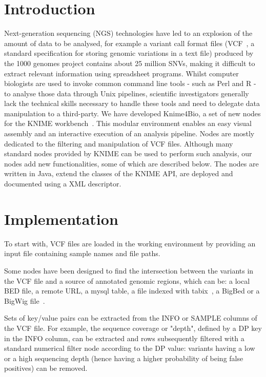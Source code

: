\documentclass{bioinfo}
\begin{document}
\section{Introduction}

Next-generation sequencing (NGS) technologies have led to an explosion of the amount of data to be analysed, for example a variant call format files (VCF~\citep{pmid21653522}, a standard specification for storing genomic variations in a text file)  produced by the 1000 genomes project contains about 25 million SNVs, making it difficult to extract relevant information using spreadsheet programs. Whilst computer biologists are used to invoke common command line tools - such as Perl and R - to analyse those data through Unix pipelines, scientific investigators generally lack the technical skills necessary to handle these tools and need to delegate data manipulation to a third-party. 
We have developed Knime4Bio, a set of new nodes  for the KNIME workbench~\citep{knimeref}. This modular environment enables an easy visual assembly and an interactive execution of an analysis pipeline. Nodes are mostly dedicated to the filtering and manipulation of VCF files. Although many standard nodes provided by KNIME can be used to perform such analysis, our nodes add new functionalities, some of which are described below. The nodes are written in Java, extend the classes of the KNIME API, are deployed and documented using a XML descriptor.

\section{Implementation}

To start with, VCF files are loaded in the working environment by providing an input file containing sample names and file paths.

Some nodes have been designed to find the intersection between the variants in the VCF file and a source of annotated genomic regions, which can be: a local BED file, a remote URL, a mysql table, a file indexed with tabix~\citep{pmid21208982}, a BigBed or a BigWig file~\citep{pmid20639541}.


Sets of key/value pairs can be extracted from the INFO or SAMPLE columns of the VCF file. For example, the sequence coverage or "depth", defined by a DP key in the INFO column, can be extracted and rows subsequently filtered with a standard numerical filter node according to the DP value: variants having a low or a high sequencing depth (hence having a higher probability of being false positives) can be removed.
\end{document}
